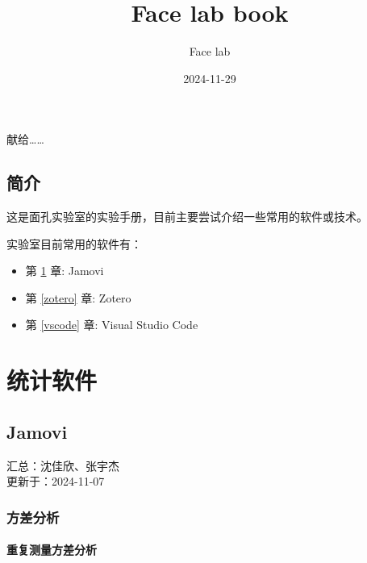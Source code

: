 \documentclass[]{ctexbook}
\title{Face lab book}
\author{Face lab}
\date{2024-11-29}
\providecommand{\tightlist}{%
  \setlength{\itemsep}{0pt}\setlength{\parskip}{0pt}}
\theoremstyle{definition}
\theoremstyle{definition}
\theoremstyle{definition}
\theoremstyle{definition}
\theoremstyle{remark}
\begin{document}
\maketitle


\thispagestyle{empty}

\begin{center}
献给……

\end{center}

\setlength{\abovedisplayskip}{-5pt}
\setlength{\abovedisplayshortskip}{-5pt}

{
\setcounter{tocdepth}{2}
\tableofcontents
}
\listoftables
\listoffigures
\chapter{简介}\label{ux7b80ux4ecb}

这是面孔实验室的实验手册，目前主要尝试介绍一些常用的软件或技术。

实验室目前常用的软件有：

\begin{itemize}
\tightlist
\item
  第 \ref{jamovi} 章: Jamovi\\
\item
  第 \ref{zotero} 章: Zotero
\item
  第 \ref{vscode} 章: Visual Studio Code
\end{itemize}

\mainmatter

\part{统计软件}\label{part-ux7edfux8ba1ux8f6fux4ef6}

\chapter{Jamovi}\label{jamovi}

汇总：沈佳欣、张宇杰\\
更新于：2024-11-07

\section{方差分析}\label{ux65b9ux5deeux5206ux6790}

\subsection{重复测量方差分析}\label{ux91cdux590dux6d4bux91cfux65b9ux5deeux5206ux6790}
\end{document}
